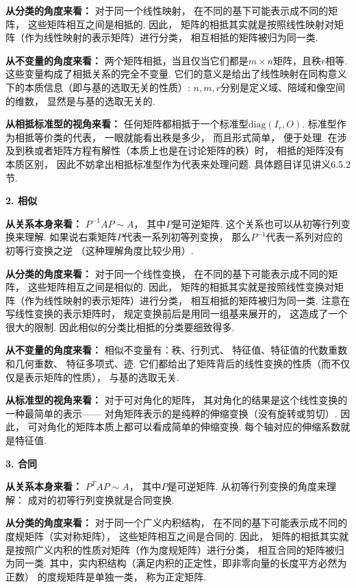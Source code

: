 \textbf{从分类的角度来看：}
对于同一个线性映射，
在不同的基下可能表示成不同的矩阵，
这些矩阵相互之间是相抵的.
因此，
矩阵的相抵其实就是按照线性映射对矩阵（作为线性映射的表示矩阵）进行分类，
相互相抵的矩阵被归为同一类.

\textbf{从不变量的角度来看：}
两个矩阵相抵，当且仅当它们都是$m \times n$矩阵，且秩$r$相等.
这些变量构成了相抵关系的完全不变量.
它们的意义是给出了线性映射在同构意义下的本质信息（即与基的选取无关的性质）:
$n,m,r$分别是定义域、陪域和像空间的维数，
显然是与基的选取无关的.

\textbf{从相抵标准型的视角来看：}
任何矩阵都相抵于一个标准型$\mathrm{diag}(I_r, O)$.
标准型作为相抵等价类的代表，
一眼就能看出秩是多少，
而且形式简单，
便于处理.
在涉及到秩或者矩阵方程有解性（本质上也是在讨论矩阵的秩）时，
相抵的矩阵没有本质区别，
因此不妨拿出相抵标准型作为代表来处理问题.
具体题目详见讲义6.5.2节.

\bigskip

\textbf{2. 相似}

\textbf{从关系本身来看：}
$P^{-1} AP \sim A$，
其中$P$是可逆矩阵.
这个关系也可以从初等行列变换来理解.
如果说右乘矩阵$P$代表一系列初等列变换，
那么$P^{-1}$代表一系列对应的初等行变换之逆
（这种理解角度比较少用）.

\textbf{从分类的角度来看：}
对于同一个线性变换，
在不同的基下可能表示成不同的矩阵，
这些矩阵相互之间是相似的.
因此，
矩阵的相抵其实就是按照线性变换对矩阵（作为线性映射的表示矩阵）进行分类，
相互相抵的矩阵被归为同一类.
注意在写线性变换的表示矩阵时，
规定变换前后是用同一组基来展开的，
这造成了一个很大的限制.
因此相似的分类比相抵的分类要细致得多.

\textbf{从不变量的角度来看：}
相似不变量有：秩、行列式、
特征值、特征值的代数重数和几何重数、
特征多项式、迹.
它们都给出了矩阵背后的线性变换的性质（而不仅仅是表示矩阵的性质），
与基的选取无关.


\textbf{从标准型的视角来看：}
对于可对角化的矩阵，
其对角化的结果是这个线性变换的一种最简单的表示——
对角矩阵表示的是纯粹的伸缩变换（没有旋转或剪切）.
因此，
可对角化的矩阵本质上都可以看成简单的伸缩变换.
每个轴对应的伸缩系数就是特征值.

\bigskip

\textbf{3. 合同}

\textbf{从关系本身来看：}
$P^T AP \sim A$，
其中$P$是可逆矩阵.
从初等行列变换的角度来理解：
成对的初等行列变换就是合同变换.

\textbf{从分类的角度来看：}
对于同一个广义内积结构，
在不同的基下可能表示成不同的度规矩阵（实对称矩阵），
这些矩阵相互之间是合同的.
因此，
矩阵的相抵其实就是按照广义内积的性质对矩阵（作为度规矩阵）进行分类，
相互合同的矩阵被归为同一类.
其中，实内积结构（满足内积的正定性，即非零向量的长度平方必然为正数）
的度规矩阵是单独一类，
称为正定矩阵.

